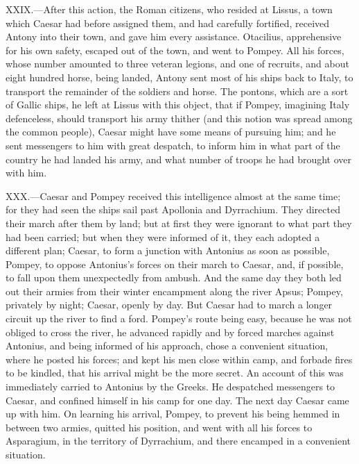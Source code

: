 XXIX.—After this action, the Roman citizens, who resided at Lissus, a
town which Caesar had before assigned them, and had carefully fortified,
received Antony into their town, and gave him every assistance.
Otacilius, apprehensive for his own safety, escaped out of the town, and
went to Pompey. All his forces, whose number amounted to three veteran
legions, and one of recruits, and about eight hundred horse, being
landed, Antony sent most of his ships back to Italy, to transport the
remainder of the soldiers and horse. The pontons, which are a sort of
Gallic ships, he left at Lissus with this object, that if Pompey,
imagining Italy defenceless, should transport his army thither (and this
notion was spread among the common people), Caesar might have some means
of pursuing him; and he sent messengers to him with great despatch, to
inform him in what part of the country he had landed his army, and what
number of troops he had brought over with him.

XXX.—Caesar and Pompey received this intelligence almost at the same
time; for they had seen the ships sail past Apollonia and Dyrrachium.
They directed their march after them by land; but at first they were
ignorant to what part they had been carried; but when they were informed
of it, they each adopted a different plan; Caesar, to form a junction
with Antonius as soon as possible, Pompey, to oppose Antonius's forces
on their march to Caesar, and, if possible, to fall upon them
unexpectedly from ambush. And the same day they both led out their
armies from their winter encampment along the river Apsus; Pompey,
privately by night; Caesar, openly by day. But Caesar had to march a
longer circuit up the river to find a ford. Pompey's route being easy,
because he was not obliged to cross the river, he advanced rapidly and
by forced marches against Antonius, and being informed of his approach,
chose a convenient situation, where he posted his forces; and kept his
men close within camp, and forbade fires to be kindled, that his arrival
might be the more secret. An account of this was immediately carried to
Antonius by the Greeks. He despatched messengers to Caesar, and confined
himself in his camp for one day. The next day Caesar came up with him.
On learning his arrival, Pompey, to prevent his being hemmed in between
two armies, quitted his position, and went with all his forces to
Asparagium, in the territory of Dyrrachium, and there encamped in a
convenient situation.


